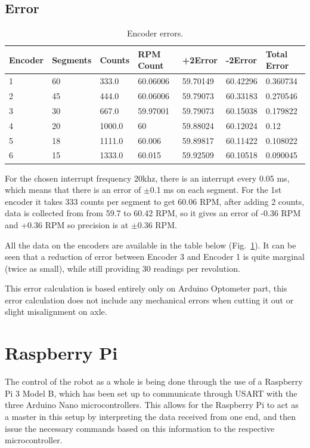 \documentclass[11pt]{article}
\begin{document}
\subsection*{Error}
\begin{table}[h]
  \centering
  \begin{tabular}{l|l|l|l|l|l|l}
  Encoder  & Segments  & Counts  & RPM Count & +2Error  & -2Error  & Total Error  \\ \hline
  1  & 60  & 333.0  & 60.06006  & 59.70149  & 60.42296  & 0.360734  \\
  2  & 45  & 444.0  & 60.06006  & 59.79073  & 60.33183  & 0.270546  \\
  3  & 30  & 667.0  & 59.97001  & 59.79073  & 60.15038  & 0.179822  \\
  4  & 20  & 1000.0  & 60  &  59.88024  & 60.12024 & 0.12\\
  5  & 18  & 1111.0  & 60.006  & 59.89817  & 60.11422  & 0.108022  \\
    6  & 15  & 1333.0  & 60.015  & 59.92509  & 60.10518  &  0.090045 \\
  \end{tabular}
  \caption{Encoder errors.}
  \label{encoder-table}
\end{table}
For the chosen interrupt frequency 20khz, there is an interrupt every 0.05 ms, which means that there is an error of $\pm$0.1 ms on each segment. For the 1st encoder it takes 333 counts per segment to get 60.06 RPM, after adding 2 counts, data is collected from from 59.7 to 60.42 RPM, so it gives an error of -0.36 RPM and +0.36 RPM so precision is at $\pm$0.36 RPM.


All the data on the encoders are available in the table below (Fig.~\ref{encoder-table}). It can be seen that a reduction of error between Encoder 3 and Encoder 1 is quite marginal (twice as small), while still providing 30 readings per revolution.


This error calculation is based entirely only on Arduino Optometer part, this error calculation does not include any mechanical errors when cutting it out or slight misalignment on axle.

\newpage
\section{Raspberry Pi}
The control of the robot as a whole is being done through the use of a Raspberry Pi 3 Model B, which has been set up to communicate through USART with the three Arduino Nano microcontrollers. This allows for the Raspberry Pi to act as a master in this setup by interpreting the data received from one end, and then issue the necessary commands based on this information to the respective microcontroller.
\end{document}
